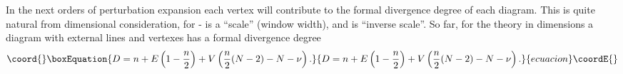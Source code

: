 \documentclass[a4paper,a4paper]{article}
\begin{document}
In the next orders of perturbation expansion each vertex will contribute 
\coordHE{} to the formal divergence degree of each diagram. This is quite 
natural from dimensional consideration, for \coordHE{} - is a ``scale'' (window 
width), and \coordHE{} is ``inverse scale''.  
So far, for the \coordHE{} theory 
in \coordHE{} dimensions a diagram with \coordHE{} external lines and \coordHE{} vertexes 
has a formal divergence degree 
\begin{equation}\coord{}\boxEquation{
D = n + E\left({1-\frac{n}{2}}\right) 
+ V\left({\frac{n}{2}(N-2)-N-\nu}\right). 
\label{dd}
}{
D = n + E\left({1-\frac{n}{2}}\right) 
+ V\left({\frac{n}{2}(N-2)-N-\nu}\right). 
}{ecuacion}\coordE{}\end{equation} 
\end{document}
